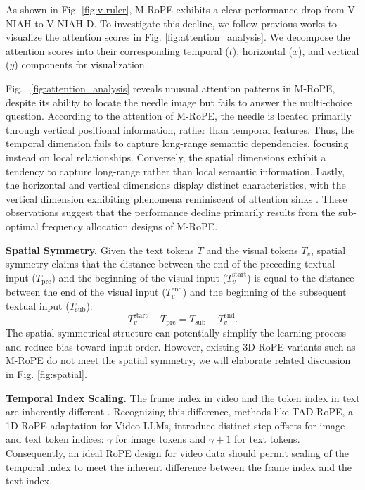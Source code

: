 As shown in Fig. \ref{fig:v-ruler}, M-RoPE exhibits a clear performance drop from V-NIAH to V-NIAH-D. To investigate this decline, we follow previous works \citep{xiao2023efficient,liu2023scaling,barbero2024round} to visualize the attention scores in Fig. \ref{fig:attention_analysis}. We decompose the attention scores into their corresponding temporal ($t$), horizontal ($x$), and vertical ($y$) components for visualization.

Fig.~ \ref{fig:attention_analysis} reveals unusual attention patterns in M-RoPE, despite its ability to locate the needle image but fails to answer the multi-choice question.
According to the attention of M-RoPE, the needle is located primarily through vertical positional information, rather than temporal features.
Thus, the temporal dimension fails to capture long-range semantic dependencies, focusing instead on local relationships.
Conversely, the spatial dimensions exhibit a tendency to capture long-range rather than local semantic information.
Lastly, the horizontal and vertical dimensions display distinct characteristics, with the vertical dimension exhibiting phenomena reminiscent of attention sinks \cite{xiao2023efficient}.
These observations suggest that the performance decline primarily results from the sub-optimal frequency allocation designs of M-RoPE.

\noindent \textbf{Spatial Symmetry.} Given the text tokens $T$ and the visual tokens $T_v$, spatial symmetry \cite{kexuefm10352} claims that the distance between the end of the preceding textual input ($T_{\text{pre}}$) and the beginning of the visual input ($T_v^{\text{start}}$) is equal to the distance between the end of the visual input ($T_v^{\text{end}}$) and the beginning of the subsequent textual input ($T_{\text{sub}}$):
\begin{equation}
    T_{v}^{\text{start}} - T_{\text{pre}} =
    T_{\text{sub}} - T_{v}^{\text{end}}.
\end{equation}
The spatial symmetrical structure can potentially simplify the learning process and reduce bias toward input order.
However, existing 3D RoPE variants such as M-RoPE do not meet the spatial symmetry, we will elaborate related discussion in Fig. \ref{fig:spatial}.



\noindent \textbf{Temporal Index Scaling.}
The frame index in video and the token index in text are inherently different \cite{kexuefm10352,li2024temporal}.
Recognizing this difference, methods like TAD-RoPE, a 1D RoPE adaptation for Video LLMs, introduce distinct step offsets for image and text token indices: $\gamma$ for image tokens and $\gamma+1$ for text tokens.
Consequently, an ideal RoPE design for video data should permit scaling of the temporal index to meet the inherent difference between the frame index and the text index.

